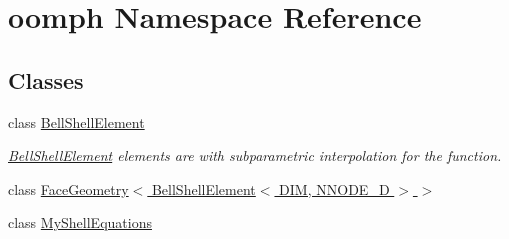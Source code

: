 \hypertarget{namespaceoomph}{}\section{oomph Namespace Reference}
\label{namespaceoomph}
\subsection*{Classes}
\begin{DoxyCompactItemize}
\item 
class \hyperlink{classoomph_1_1BellShellElement}{Bell\+Shell\+Element}
\begin{DoxyCompactList}\small\item\em \hyperlink{classoomph_1_1BellShellElement}{Bell\+Shell\+Element} elements are with subparametric interpolation for the function. \end{DoxyCompactList}\item 
class \hyperlink{classoomph_1_1FaceGeometry_3_01BellShellElement_3_01DIM_00_01NNODE__1D_01_4_01_4}{Face\+Geometry$<$ Bell\+Shell\+Element$<$ D\+I\+M, N\+N\+O\+D\+E\+\_\+D $>$ $>$}
\item 
class \hyperlink{classoomph_1_1MyShellEquations}{My\+Shell\+Equations}
\end{DoxyCompactItemize}
